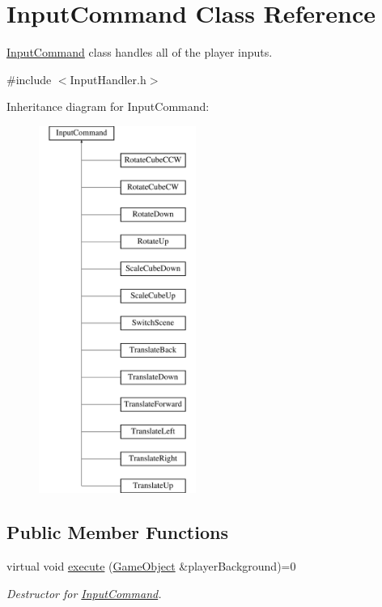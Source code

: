 \hypertarget{class_input_command}{}\section{Input\+Command Class Reference}
\label{class_input_command}


\mbox{\hyperlink{class_input_command}{Input\+Command}} class handles all of the player inputs.  




{\ttfamily \#include $<$Input\+Handler.\+h$>$}

Inheritance diagram for Input\+Command\+:\begin{figure}[H]
\begin{center}
\leavevmode
\includegraphics[height=12.000000cm]{class_input_command}
\end{center}
\end{figure}
\subsection*{Public Member Functions}
\begin{DoxyCompactItemize}
\item 
\mbox{\label{class_input_command_a14fb500713d0813165f0c864d47553a0}} 
virtual void \mbox{\hyperlink{class_input_command_a14fb500713d0813165f0c864d47553a0}{execute}} (\mbox{\hyperlink{class_game_object}{Game\+Object}} \&player\+Background)=0
\begin{DoxyCompactList}\small\item\em Destructor for \mbox{\hyperlink{class_input_command}{Input\+Command}}. \end{DoxyCompactList}\end{DoxyCompactItemize}
